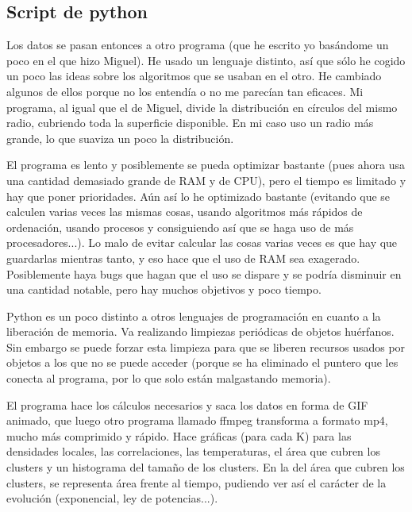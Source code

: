 \documentclass[twoside]{article}
\begin{document}
\begin{multicols}{2}
\subsection*{Script de python}

Los datos se pasan entonces a otro programa (que he escrito yo bas\'andome un poco en el que hizo Miguel). He usado un lenguaje distinto, as\'i que s\'olo he cogido un poco las ideas sobre los algoritmos que se usaban en el otro. He cambiado algunos de ellos porque no los entend\'ia o no me parec\'ian tan eficaces. Mi programa, al igual que el de Miguel, divide la distribuci\'on en c\'irculos del mismo radio, cubriendo toda la superficie disponible. En mi caso uso un radio m\'as grande, lo que suaviza un poco la distribuci\'on.

El programa es lento y posiblemente se pueda optimizar bastante (pues ahora usa una cantidad demasiado grande de RAM y de CPU), pero el tiempo es limitado y hay que poner prioridades. A\'un as\'i lo he optimizado bastante (evitando que se calculen varias veces las mismas cosas, usando algoritmos m\'as r\'apidos de ordenaci\'on, usando procesos y consiguiendo as\'i que se haga uso de m\'as procesadores...). Lo malo de evitar calcular las cosas varias veces es que hay que guardarlas mientras tanto, y eso hace que el uso de RAM sea exagerado. Posiblemente haya bugs que hagan que el uso se dispare y se podr\'ia disminuir en una cantidad notable, pero hay muchos objetivos y poco tiempo.

Python es un poco distinto a otros lenguajes de programaci\'on en cuanto a la liberaci\'on de memoria. Va realizando limpiezas peri\'odicas de objetos hu\'erfanos. Sin embargo se puede forzar esta limpieza para que se liberen recursos usados por objetos a los que no se puede acceder (porque se ha eliminado el puntero que les conecta al programa, por lo que solo est\'an malgastando memoria).

El programa hace los c\'alculos necesarios y saca los datos en forma de GIF animado, que luego otro programa llamado ffmpeg transforma a formato mp4, mucho m\'as comprimido y r\'apido. Hace gr\'aficas (para cada K) para las densidades locales, las correlaciones, las temperaturas, el \'area que cubren los clusters y un histograma del tama\~no de los clusters. En la del \'area que cubren los clusters, se representa \'area frente al tiempo, pudiendo ver as\'i el car\'acter de la evoluci\'on (exponencial, ley de potencias...).




\end{multicols}
\end{document}
